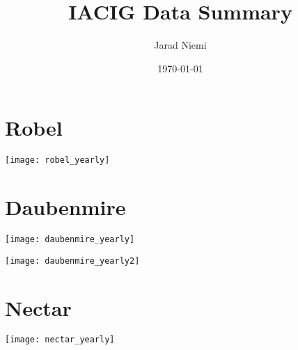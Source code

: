 \documentclass{article}
\title{IACIG Data Summary}
\author{Jarad Niemi}
\date{\today}
\begin{document}
\maketitle

\section{Robel}


\texttt{[image: robel\_yearly]}

\newpage
\section{Daubenmire}

\texttt{[image: daubenmire\_yearly]}

\texttt{[image: daubenmire\_yearly2]}

\clearpage
\section{Nectar}

\texttt{[image: nectar\_yearly]}
\end{document}
